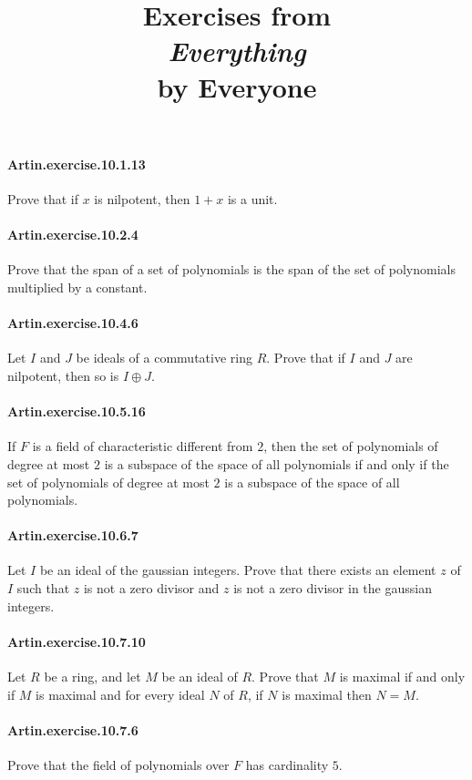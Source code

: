 \documentclass{article}
\title{\textbf{
Exercises from \\
\textit{Everything} \\
by Everyone
}}
\date{}
\begin{document}
\maketitle

\paragraph{Artin.exercise.10.1.13} Prove that if $x$ is nilpotent, then $1+x$ is a unit.

\paragraph{Artin.exercise.10.2.4} Prove that the span of a set of polynomials is the span of the set of polynomials multiplied by a constant.

\paragraph{Artin.exercise.10.4.6} Let $I$ and $J$ be ideals of a commutative ring $R$. Prove that if $I$ and $J$ are nilpotent, then so is $I \oplus J$.

\paragraph{Artin.exercise.10.5.16} If $F$ is a field of characteristic different from $2$, then the set of polynomials of degree at most $2$ is a subspace of the space of all polynomials if and only if the set of polynomials of degree at most $2$ is a subspace of the space of all polynomials.

\paragraph{Artin.exercise.10.6.7} Let $I$ be an ideal of the gaussian integers. Prove that there exists an element $z$ of $I$ such that $z$ is not a zero divisor and $z$ is not a zero divisor in the gaussian integers.

\paragraph{Artin.exercise.10.7.10} Let $R$ be a ring, and let $M$ be an ideal of $R$. Prove that $M$ is maximal if and only if $M$ is maximal and for every ideal $N$ of $R$, if $N$ is maximal then $N = M$.

\paragraph{Artin.exercise.10.7.6} Prove that the field of polynomials over $F$ has cardinality $5$.
\end{document}
